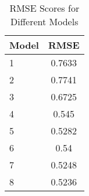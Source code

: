 
\begin{table}[ht]
\centering
\begin{tabular}{lc}
\hline
Model & RMSE \\
\hline
1 &  0.7633  \\
2 &  0.7741  \\
3 &  0.6725  \\
4 &  0.545  \\
5 &  0.5282  \\
6 &  0.54  \\
7 &  0.5248  \\
8 &  0.5236  \\
\hline
\end{tabular}
\caption{RMSE Scores for Different Models}
\label{tab:rmse_scores}
\end{table}

